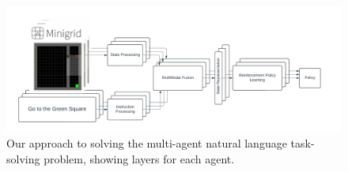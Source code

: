 \documentclass[11pt]{article}
\begin{document}
\begin{figure}[!t]
  \centering
  \includegraphics[width=\linewidth]{figs/modeloverviewactual.pdf}
  \caption{Our approach to solving the multi-agent natural language task-solving problem, showing layers for each agent.}
  \label{fig:modeloverview}
\end{figure}




% 


\end{document}
